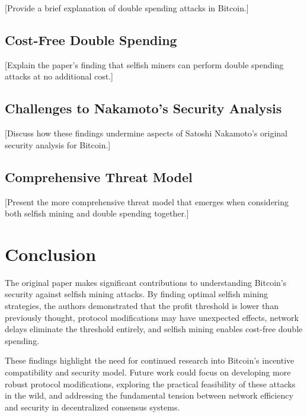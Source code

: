 \documentclass[conference]{IEEEtran}
\begin{document}
[Provide a brief explanation of double spending attacks in Bitcoin.]

\subsection{Cost-Free Double Spending}

[Explain the paper's finding that selfish miners can perform double spending attacks at no additional cost.]

\subsection{Challenges to Nakamoto's Security Analysis}

[Discuss how these findings undermine aspects of Satoshi Nakamoto's original security analysis for Bitcoin.]

\subsection{Comprehensive Threat Model}

[Present the more comprehensive threat model that emerges when considering both selfish mining and double spending together.]

\section{Conclusion}

The original paper makes significant contributions to understanding Bitcoin's security against selfish mining attacks. By finding optimal selfish mining strategies, the authors demonstrated that the profit threshold is lower than previously thought, protocol modifications may have unexpected effects, network delays eliminate the threshold entirely, and selfish mining enables cost-free double spending.

These findings highlight the need for continued research into Bitcoin's incentive compatibility and security model. Future work could focus on developing more robust protocol modifications, exploring the practical feasibility of these attacks in the wild, and addressing the fundamental tension between network efficiency and security in decentralized consensus systems.



\end{document}
